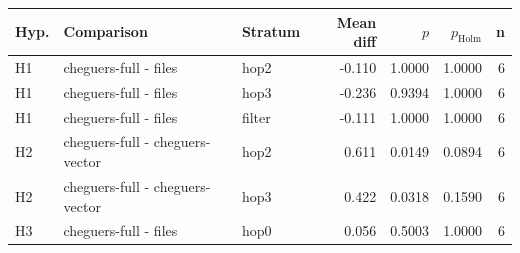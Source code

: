 \begin{tabular}{lllrrrr}
\toprule
Hyp. & Comparison & Stratum & Mean diff & $p$ & $p_{\mathrm{Holm}}$ & n \\
\midrule
H1 & cheguers-full - files & hop2 & -0.110 & 1.0000 & 1.0000 & 6 \\
H1 & cheguers-full - files & hop3 & -0.236 & 0.9394 & 1.0000 & 6 \\
H1 & cheguers-full - files & filter & -0.111 & 1.0000 & 1.0000 & 6 \\
H2 & cheguers-full - cheguers-vector & hop2 & 0.611 & 0.0149 & 0.0894 & 6 \\
H2 & cheguers-full - cheguers-vector & hop3 & 0.422 & 0.0318 & 0.1590 & 6 \\
H3 & cheguers-full - files & hop0 & 0.056 & 0.5003 & 1.0000 & 6 \\
\bottomrule
\end{tabular}
